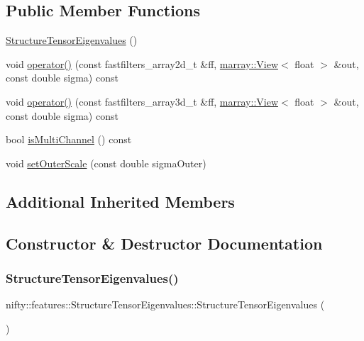 \subsection*{Public Member Functions}
\begin{DoxyCompactItemize}
\item 
\hyperlink{structnifty_1_1features_1_1StructureTensorEigenvalues_a9691bb7847cc244a100c566f20e7f4cd}{Structure\+Tensor\+Eigenvalues} ()
\item 
void \hyperlink{structnifty_1_1features_1_1StructureTensorEigenvalues_a514f1f20f7535404e91ed6ddad56dffe}{operator()} (const fastfilters\+\_\+array2d\+\_\+t \&ff, \hyperlink{classandres_1_1View}{marray\+::\+View}$<$ float $>$ \&out, const double sigma) const
\item 
void \hyperlink{structnifty_1_1features_1_1StructureTensorEigenvalues_a18437b6743a641b081b6053115305bad}{operator()} (const fastfilters\+\_\+array3d\+\_\+t \&ff, \hyperlink{classandres_1_1View}{marray\+::\+View}$<$ float $>$ \&out, const double sigma) const
\item 
bool \hyperlink{structnifty_1_1features_1_1StructureTensorEigenvalues_aca7d1180adccc1ddbd657bfce7d349ac}{is\+Multi\+Channel} () const
\item 
void \hyperlink{structnifty_1_1features_1_1StructureTensorEigenvalues_a55717fa81aee4a1faa8538be206a572f}{set\+Outer\+Scale} (const double sigma\+Outer)
\end{DoxyCompactItemize}
\subsection*{Additional Inherited Members}


\subsection{Constructor \& Destructor Documentation}
\mbox{\label{structnifty_1_1features_1_1StructureTensorEigenvalues_a9691bb7847cc244a100c566f20e7f4cd}} 
\subsubsection{\texorpdfstring{Structure\+Tensor\+Eigenvalues()}{StructureTensorEigenvalues()}}
{\footnotesize\ttfamily nifty\+::features\+::\+Structure\+Tensor\+Eigenvalues\+::\+Structure\+Tensor\+Eigenvalues (\begin{DoxyParamCaption}{ }\end{DoxyParamCaption})\hspace{0.3cm}{\ttfamily [inline]}}



